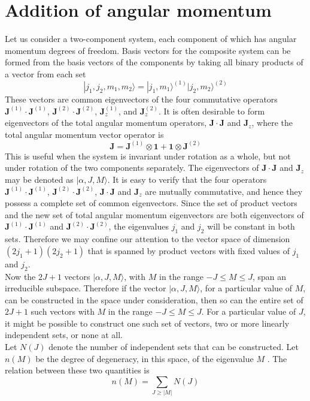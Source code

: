 \section{Addition of angular momentum}
Let us consider a two-component system, each component of which has angular momentum degrees of freedom. Basis vectors for the composite system can be formed from the basis vectors of the components by taking all binary products of a vector from each set
\[|j_1,j_2,m_1,m_2\rangle = |j_1,m_1\rangle ^{(1)} |j_2,m_2\rangle ^{(2)}\]
These vectors are common eigenvectors of the four commutative operators $\bm{J}^{(1)}\cdot\bm{J}^{(1)}$, $\bm{J}^{(2)}\cdot\bm{J}^{(2)}$, $\bm{J}_z^{(1)}$, and $\bm{J}_z^{(2)}$.
It is often desirable to form eigenvectors of the total angular momentum operators, $\bm{J}\cdot\bm{J}$ and $\bm{J}_z$, where the total angular momentum vector operator is
\[\bm{J} = \bm{J}^{(1)}\otimes\bm{1} + \bm{1}\otimes\bm{J}^{(2)}\]
This is useful when the system is invariant under rotation as a whole, but not under rotation of the two components separately. 
The eigenvectors of $\bm{J}\cdot\bm{J}$ and $\bm{J}_z$ may be denoted as $|\alpha, J, M \rangle$. It is easy to verify that the four operators $\bm{J}^{(1)}\cdot\bm{J}^{(1)}$, $\bm{J}^{(2)}\cdot\bm{J}^{(2)}$, $\bm{J}\cdot\bm{J}$ and $\bm{J}_z$ are mutually commutative, and hence they possess a complete set of common eigenvectors. 
Since the set of product vectors and the new set of total angular momentum eigenvectors are both eigenvectors of $\bm{J}^{(1)}\cdot\bm{J}^{(1)}$ and $\bm{J}^{(2)}\cdot\bm{J}^{(2)}$, the eigenvalues $j_1$ and $j_2$ will be constant in both sets. Therefore
we may confine our attention to the vector space of dimension $(2j_1+1)(2j_2+1)$ that is spanned by product vectors with fixed values of $j_1$ and $j_2$.\\
Now the $2J+1$ vectors $|\alpha, J, M \rangle$, with $M$ in the range $-J \leq M \leq J$, span an irreducible subspace.
Therefore if the vector $|\alpha, J, M \rangle$, for a particular value of $M$, can be constructed in the space under consideration, then so can the entire set of $2J+1$
such vectors with $M$ in the range $-J \leq M \leq J$.
For a particular value of $J$, it might be possible to construct one such set of vectors, two or more linearly independent sets, or none at all. \\
Let $N(J)$ denote the number of independent sets that can be constructed. Let $n(M)$ be the degree of degeneracy, in this space, of the eigenvalue $M$ . The relation between these two quantities is
\[n(M) = \sum_{J \geq |M|} N(J)\]
